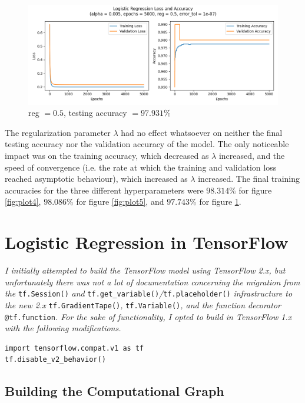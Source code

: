 \documentclass[letter]{article}
\begin{document}
\begin{figure}[H]
	\centering
	\includegraphics[width=\linewidth]{Figure_6}
	\caption{reg $ = 0.5$, testing accuracy $ = 97.931\%$}
	\label{fig:plot6}
\end{figure}

The regularization parameter $\lambda$ had no effect whatsoever on neither the final testing accuracy nor the validation accuracy of the model. The only noticeable impact was on the training accuracy, which decreased as $\lambda$ increased, and the speed of convergence (i.e. the rate at which the training and validation loss reached asymptotic behaviour), which increased as $\lambda$ increased. The final training accuracies for the three different hyperparameters were $98.314\%$ for figure \ref{fig:plot4}, $98.086\%$ for figure \ref{fig:plot5}, and $97.743\%$ for figure \ref{fig:plot6}.

\newpage

\section{Logistic Regression in TensorFlow}

\textit{I initially attempted to build the TensorFlow model using TensorFlow 2.x, but unfortunately there was not a lot of documentation concerning the migration from the} \texttt{tf.Session()} \textit{and}  \texttt{tf.get\_variable()}\textit{/}\texttt{tf.placeholder()} \textit{infrastructure to the new 2.x} \texttt{tf.GradientTape()}\textit{,} \texttt{tf.Variable()}\textit{, and the function decorator} \texttt{@tf.function}\textit{. For the sake of functionality, I opted to build in TensorFlow 1.x with the following modifications.}

\begin{lstlisting}
import tensorflow.compat.v1 as tf
tf.disable_v2_behavior()
\end{lstlisting}

\subsection{Building the Computational Graph}
\end{document}
